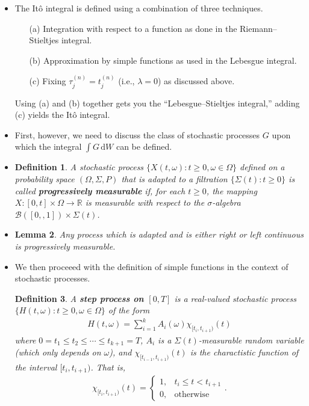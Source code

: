 \documentclass[10pt]{article}
\newtheorem{lemma}{Lemma}
\newtheorem{definition}[lemma]{Definition}
\newcommand{\dee}{\mathrm{d}}
\newcommand{\mcal}[1]{\mathcal{#1}}
\newcommand{\Real}{\mathbb{R}}
\begin{document}
\begin{itemize}
  \item The It\^{o} integral is defined using a combination of three techniques.
  \begin{itemize}
    \item[(a)] Integration with respect to a function as done in the Riemann--Stieltjes integral.
    \item[(b)] Approximation by simple functions as used in the Lebesgue integral.
    \item[(c)] Fixing $\tau_{j}^{(n)} = t_{j}^{(n)}$ (i.e., $\lambda = 0$) as discussed above.
  \end{itemize}
  Using (a) and (b) together gets you the ``Lebesgue--Stieltjes integral,'' adding (c) yields the It\^{o} integral.

  \item First, however, we need to discuss the class of stochastic processes $G$ upon which the integral $\int G\, \dee W$ can be defined.
  
  \item \begin{definition}
    A stochastic process $\{ X(t, \omega): t \geq 0, \omega \in \Omega \}$ defined on a probability space $(\Omega, \Sigma, P)$ that is adapted to a filtration $\{ \Sigma(t) : t \geq 0 \}$ is called {\bf progressively measurable} if, for each $t \geq 0$, the mapping $X: [0,t] \times \Omega \rightarrow \Real$ is measurable with respect to the $\sigma$-algebra $\mcal{B}([0,,1]) \times \Sigma(t)$.
  \end{definition}

  \item \begin{lemma}
    Any process which is adapted and is either right or left continuous is progressively measurable.
  \end{lemma}

  \item We then proceeed with the definition of simple functions in the context of stochastic processes.
  
  \begin{definition}
    A {\bf step process on $[0,T]$} is a real-valued stochastic process $\{ H(t,\omega) : t \geq 0, \omega \in \Omega \}$ of the form
    \begin{align*}
      H(t,\omega) = \sum_{i=1}^k A_i(\omega) \chi_{[t_{i}, t_{i+1})}(t)
    \end{align*}
    where $0 = t_1 \leq t_2 \leq \dotsb \leq t_{k+1} = T$, $A_i$ is a $\Sigma(t)$-measurable random variable (which only depends on $\omega$), and $\chi_{[t_{i-1}, t_{i+1})}(t)$ is the charactistic function of the interval $[t_{i}, t_{i+1})$. That is,
    \begin{align*}
      \chi_{[t_{i}, t_{i+1})}(t) = \begin{cases}
        1, & t_{i} \leq t < t_{i+1} \\
        0, & \mbox{otherwise}
      \end{cases}.
    \end{align*}        
  \end{definition}


\end{itemize}
\end{document}
